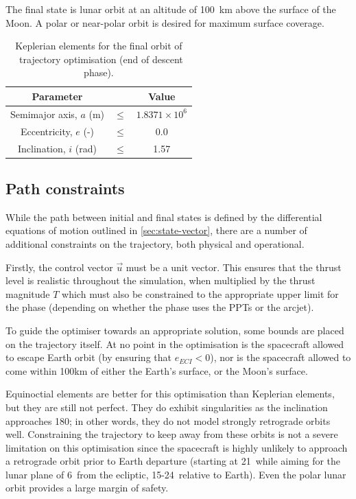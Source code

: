 The final state is lunar orbit at an altitude of 100~km above the surface of the Moon. A polar or near-polar orbit is desired for maximum surface coverage.

\begin{table}[h]
\caption{Keplerian elements for the final orbit of \BW\ trajectory optimisation (end of descent phase).}
\label{tab:Phase-5-constraints}
\centering
\begin{tabular} {ccc}\toprule
Parameter && Value\\\midrule
Semimajor axis, $a$ (m) &$\le$& $1.8371\times 10^6$\\
Eccentricity, $e$ (-) &$\le$& 0.0\\
Inclination, $i$ (rad) &$\le$& 1.57\\\bottomrule
\end{tabular}
\end{table}

\subsection{Path constraints} \label{sub:Path-constraints}

While the path between initial and final states is defined by the differential equations of motion outlined in \autoref{sec:state-vector}, there are a number of additional constraints on the trajectory, both physical and operational.

Firstly, the control vector $\vec{u}$ must be a unit vector. This ensures that the thrust level is realistic throughout the simulation, when multiplied by the thrust magnitude $T$ which must also be constrained to the appropriate upper limit for the phase (depending on whether the phase uses the PPTs or the arcjet).

To guide the optimiser towards an appropriate solution, some bounds are placed on the trajectory itself. At no point in the optimisation is the spacecraft allowed to escape Earth orbit (by ensuring that $e_{ECI}<0$), nor is the spacecraft allowed to come within 100km of either the Earth's surface, or the Moon's surface.

Equinoctial elements are better for this optimisation than Keplerian elements, but they are still not perfect. They do exhibit singularities as the inclination approaches 180\degrees; in other words, they do not model strongly retrograde orbits well. Constraining the trajectory to keep away from these orbits is not a severe limitation on this optimisation since the spacecraft is highly unlikely to approach a retrograde orbit prior to Earth departure (starting at 21\degrees\ while aiming for the lunar plane of 6\degrees\ from the ecliptic, 15-24\degrees\ relative to Earth). Even the polar lunar orbit provides a large margin of safety.

